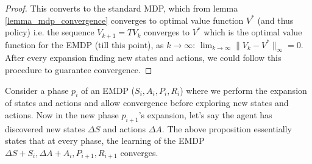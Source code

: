 \begin{proof}
This converts to the standard MDP, which from lemma \ref{lemma_mdp_convergence} converges to optimal value function $V^*$ (and thus policy) i.e. the sequence $V_{k+1} = T V_k$ converges to $V^*$  which is the optimal value function for the EMDP (till this point), as $k \to \infty$:
$\lim_{k \to \infty} \| V_k - V^* \|_\infty = 0$. 
After every expansion finding new states and actions, we could follow this procedure to guarantee convergence.



\end{proof}

Consider a phase $p_i$ of an EMDP ($S_i, A_i, P_{i}, R_{i}$) where we perform the expansion of states and actions and allow convergence before exploring new states and actions. 
Now in the new phase $p_{i+1}$'s expansion, let's say the agent has discovered new states $\Delta S$ and actions $\Delta A$.
The above proposition essentially states that at every phase, the learning of the EMDP $\Delta S+S_i, \Delta A+A_i, P_{i+1}, R_{i+1}$ converges.


